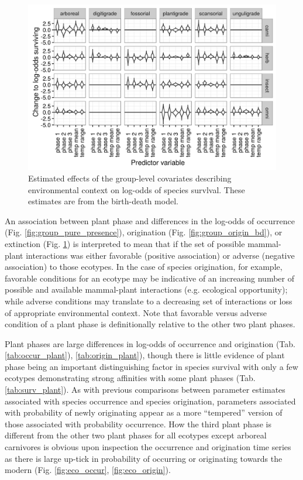 \documentclass[12pt,letterpaper]{article}
\begin{document}
\begin{figure}[ht]
  \centering
  \includegraphics[width=\textwidth,height=0.4\textheight,keepaspectratio=true]{figure/group_on_survival_bd}
  \caption[Effects of group-level covariates on log-odds of ecotype survival as estimated from the the birth-death model]{Estimated effects of the group-level covariates describing environmental context on log-odds of species survlval. These estimates are from the birth-death model.}
  \label{fig:group_surv_bd}
\end{figure}




An association between plant phase and differences in the log-odds of occurrence (Fig. \ref{fig:group_pure_presence}), origination (Fig. \ref{fig:group_origin_bd}), or extinction (Fig. \ref{fig:group_surv_bd}) is interpreted to mean that if the set of possible mammal-plant interactions was either favorable (positive association) or adverse (negative association) to those ecotypes. In the case of species origination, for example, favorable conditions for an ecotype may be indicative of an increasing number of possible and available mammal-plant interactions (e.g. ecological opportunity); while adverse conditions may translate to a decreasing set of interactions or loss of appropriate environmental context. Note that favorable versus adverse condition of a plant phase is definitionally relative to the other two plant phases.

Plant phases are large differences in log-odds of occurrence and origination (Tab. \ref{tab:occur_plant}), \ref{tab:origin_plant}), though there is little evidence of plant phase being an important distinguishing factor in species survival with only a few ecotypes demonstrating strong affinities with some plant phases (Tab. \ref{tab:surv_plant}). As with previous comparisons between parameter estimates associated with species occurrence and species origination, parameters associated with probability of newly originating appear as a more ``tempered'' version of those associated with probability occurrence.  How the third plant phase is different from the other two plant phases for all ecotypes except arboreal carnivores is obvious upon inspection the occurrence and origination time series as there is large up-tick in probability of occurring or originating towards the modern (Fig. \ref{fig:eco_occur}, \ref{fig:eco_origin}). 
\end{document}
